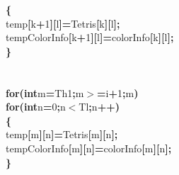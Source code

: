 \documentclass[a4paper, 10pt]{article}
\newcommand\SPC{\hspace*{0.6em}}
\newcommand\HYP{\mbox{\char 45}}
\newcommand{\CppAIdentifier}[1]{#1}
\newcommand{\CppANumber}[1]{\textcolor[rgb]{0.5,0,0.5}{#1}}
\newcommand{\CppAReservedWord}[1]{\textbf{#1}}
\newcommand{\CppASpace}[1]{\colorbox[rgb]{1,1,1}{#1}}
\newcommand{\CppASymbol}[1]{\textbf{\textcolor[rgb]{1,0,0}{#1}}}
\begin{document}
\begin{ttfamily}
\CppASpace{\SPC \SPC \SPC \SPC }\CppASymbol{\{}\\
\CppASpace{\SPC \SPC \SPC \SPC \SPC }\CppAIdentifier{temp}\CppASymbol{[}\CppAIdentifier{k}\CppASymbol{+}\CppANumber{1}\CppASymbol{]}\CppASymbol{[}\CppAIdentifier{l}\CppASymbol{]}\CppASymbol{=}\CppAIdentifier{Tetris}\CppASymbol{[}\CppAIdentifier{k}\CppASymbol{]}\CppASymbol{[}\CppAIdentifier{l}\CppASymbol{]}\CppASymbol{;}\\
\CppASpace{\SPC \SPC \SPC \SPC \SPC }\CppAIdentifier{tempColorInfo}\CppASymbol{[}\CppAIdentifier{k}\CppASymbol{+}\CppANumber{1}\CppASymbol{]}\CppASymbol{[}\CppAIdentifier{l}\CppASymbol{]}\CppASymbol{=}\CppAIdentifier{colorInfo}\CppASymbol{[}\CppAIdentifier{k}\CppASymbol{]}\CppASymbol{[}\CppAIdentifier{l}\CppASymbol{]}\CppASymbol{;}\\
\CppASpace{\SPC \SPC \SPC \SPC }\CppASymbol{\}}\\
\\
\\
\CppASpace{\SPC \SPC \SPC }\CppAReservedWord{for}\CppASymbol{(}\CppAReservedWord{int}\CppASpace{\SPC }\CppAIdentifier{m}\CppASymbol{=}\CppAIdentifier{Th}\CppASymbol{\HYP }\CppANumber{1}\CppASymbol{;}\CppAIdentifier{m}\CppASymbol{$>$=}\CppAIdentifier{i}\CppASymbol{+}\CppANumber{1}\CppASymbol{;}\CppAIdentifier{m}\CppASymbol{\HYP \HYP }\CppASymbol{)}\\
\CppASpace{\SPC \SPC \SPC \SPC \SPC }\CppAReservedWord{for}\CppASymbol{(}\CppAReservedWord{int}\CppASpace{\SPC }\CppAIdentifier{n}\CppASymbol{=}\CppANumber{0}\CppASymbol{;}\CppAIdentifier{n}\CppASymbol{$<$}\CppAIdentifier{Tl}\CppASymbol{;}\CppAIdentifier{n}\CppASymbol{++}\CppASymbol{)}\\
\CppASpace{\SPC \SPC \SPC \SPC \SPC }\CppASymbol{\{}\\
\CppASpace{\SPC \SPC \SPC \SPC \SPC \SPC }\CppAIdentifier{temp}\CppASymbol{[}\CppAIdentifier{m}\CppASymbol{]}\CppASymbol{[}\CppAIdentifier{n}\CppASymbol{]}\CppASymbol{=}\CppAIdentifier{Tetris}\CppASymbol{[}\CppAIdentifier{m}\CppASymbol{]}\CppASymbol{[}\CppAIdentifier{n}\CppASymbol{]}\CppASymbol{;}\\
\CppASpace{\SPC \SPC \SPC \SPC \SPC \SPC }\CppAIdentifier{tempColorInfo}\CppASymbol{[}\CppAIdentifier{m}\CppASymbol{]}\CppASymbol{[}\CppAIdentifier{n}\CppASymbol{]}\CppASymbol{=}\CppAIdentifier{colorInfo}\CppASymbol{[}\CppAIdentifier{m}\CppASymbol{]}\CppASymbol{[}\CppAIdentifier{n}\CppASymbol{]}\CppASymbol{;}\\
\CppASpace{\SPC \SPC \SPC \SPC \SPC }\CppASymbol{\}}\\

\end{ttfamily}
\end{document}
